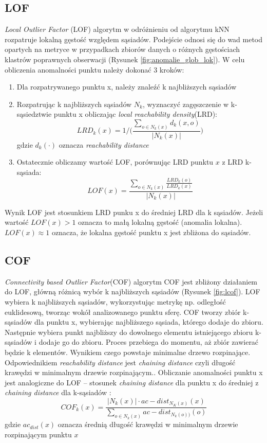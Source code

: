 \subsection{LOF}
\label{lof}
\textit{Local Outlier Factor} (LOF) \cite{lof} algorytm w odróżnieniu od algorytmu kNN rozpatruje lokalną gęstość względem sąsiadów. Podejście odnosi się do wad metod opartych na metryce w przypadkach zbiorów danych o różnych gęstościach klastrów poprawnych obserwacji (Rysunek \ref{fig:anomalie_glob_lok}).
W celu obliczenia anomalności punktu należy dokonać 3 kroków:
\begin{enumerate}
    \item Dla rozpatrywanego punktu x, należy znaleźć k najbliższych sąsiadów
    \item Rozpatrując k najbliższych sąsiadów $N_k$, wyznaczyć zagęszczenie w k-sąsiedztwie punktu x obliczając \textit{local reachability density}(LRD): 
    \begin{equation}
        LRD_k(x) = 1/\Bigg(\frac{ \sum\limits_{o \in N_k(x)} d_k(x,o) }{|N_k(x)|}\Bigg)
    \end{equation}
    gdzie $d_k(\cdot)$ oznacza \textit{reachability distance}
    \item Ostatecznie obliczamy wartość LOF, porównując LRD punktu $x$ z LRD k-sąsiada:
    \begin{equation}
        LOF(x) = \frac{ \sum\limits_{o \in N_k(x)} \frac{LRD_k(o)}{LRD_k(x)} }{|N_k(x)|}
    \end{equation}
\end{enumerate}
Wynik LOF jest stosunkiem LRD punku x do średniej LRD dla k sąsiadów.
Jeżeli wartość $LOF(x)>1$ oznacza to małą lokalną gęstość (anomalia lokalna). 
$LOF(x) \approx 1$ oznacza, że lokalna gęstość punktu x jest zbliżona do sąsiadów.

\subsection{COF}
\label{cof}
\textit{Connectivity based Outlier Factor}(COF) \cite{cof} algorytm COF jest zbliżony działaniem do LOF, główną różnicą wybór k najbliższych sąsiadów (Rysunek \ref{fig:lcof}). LOF wybiera k najbliższych sąsiadów, wykorzystując metrykę np. odległość euklidesową, tworząc wokół analizowanego punktu sferę. COF tworzy zbiór k-sąsiadów dla punktu x, wybierając najbliższego sąsiada, którego dodaje do zbioru. Następnie wybiera punkt najbliższy do dowolnego elementu istniejącego zbioru k-sąsiadów i dodaje go do zbioru. Proces przebiega do momentu, aż zbiór zawierać będzie k elementów. Wynikiem czego powstaje minimalne drzewo rozpinające. Odpowiednikiem \textit{reachability distance} jest \textit{chaining distance} czyli długość krawędzi w minimalnym drzewie rozpinającym..
Obliczanie anomalności punktu x jest analogiczne do LOF -- stosunek \textit{chaining distance} dla punktu x do średniej z \textit{chaining distance} dla k-sąsiadów :
\begin{equation}
    COF_k(x) = \frac{|N_k(x)| \cdot ac-dist_{N_K(x)}(x)}{\sum\limits_{o \in N_k(x)}ac-dist_{N_k(o))}(o)}
\end{equation}
gdzie $ac_{dist}(x)$ oznacza średnią długość krawędzi w minimalnym drzewie rozpinającym punktu $x$

